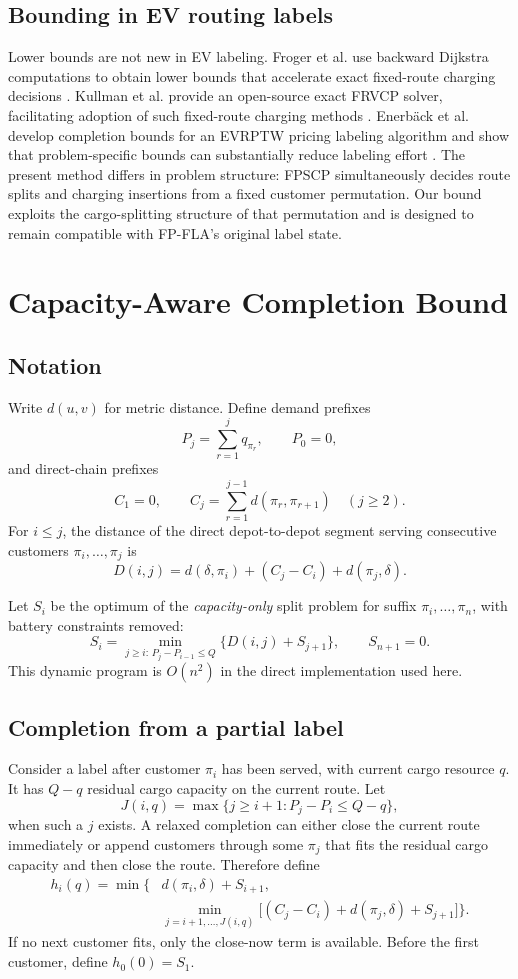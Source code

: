 \documentclass[11pt]{article}
\newcommand{\depot}{\delta}
\begin{document}
\subsection{Bounding in EV routing labels}
Lower bounds are not new in EV labeling. Froger et al. use backward Dijkstra computations to obtain lower bounds that accelerate exact fixed-route charging decisions \cite{froger2019}. Kullman et al. provide an open-source exact FRVCP solver, facilitating adoption of such fixed-route charging methods \cite{kullman2021}. Enerb\"ack et al. develop completion bounds for an EVRPTW pricing labeling algorithm and show that problem-specific bounds can substantially reduce labeling effort \cite{enerback2024}. The present method differs in problem structure: FPSCP simultaneously decides route splits and charging insertions from a fixed customer permutation. Our bound exploits the cargo-splitting structure of that permutation and is designed to remain compatible with FP-FLA's original label state.

\section{Capacity-Aware Completion Bound}
\subsection{Notation}
Write $d(u,v)$ for metric distance. Define demand prefixes
\[
P_j=\sum_{r=1}^{j} q_{\pi_r},\qquad P_0=0,
\]
and direct-chain prefixes
\[
C_1=0,\qquad C_j=\sum_{r=1}^{j-1} d(\pi_r,\pi_{r+1})\quad (j\ge 2).
\]
For $i\le j$, the distance of the direct depot-to-depot segment serving consecutive customers $\pi_i,\ldots,\pi_j$ is
\[
D(i,j)=d(\depot,\pi_i)+(C_j-C_i)+d(\pi_j,\depot).
\]

Let $S_i$ be the optimum of the \emph{capacity-only} split problem for suffix $\pi_i,\ldots,\pi_n$, with battery constraints removed:
\begin{equation}
S_i=\min_{j\ge i:\,P_j-P_{i-1}\le Q}\{D(i,j)+S_{j+1}\},\qquad S_{n+1}=0.
\label{eq:suffixdp}
\end{equation}
This dynamic program is $O(n^2)$ in the direct implementation used here.

\subsection{Completion from a partial label}
Consider a label after customer $\pi_i$ has been served, with current cargo resource $q$. It has $Q-q$ residual cargo capacity on the current route. Let
\[
J(i,q)=\max\{j\ge i+1:P_j-P_i\le Q-q\},
\]
when such a $j$ exists. A relaxed completion can either close the current route immediately or append customers through some $\pi_j$ that fits the residual cargo capacity and then close the route. Therefore define
\begin{align}
h_i(q)=\min\Bigg\{&d(\pi_i,\depot)+S_{i+1},\\
&\min_{j=i+1,\ldots,J(i,q)}\big[(C_j-C_i)+d(\pi_j,\depot)+S_{j+1}\big]\Bigg\}.
\label{eq:h}
\end{align}
If no next customer fits, only the close-now term is available. Before the first customer, define $h_0(0)=S_1$.
\end{document}
